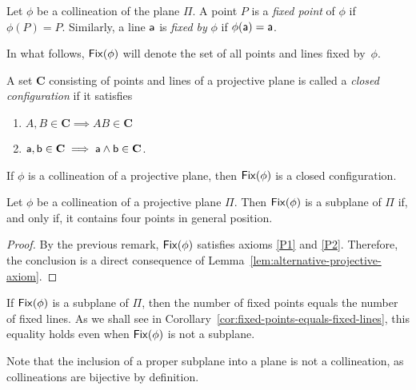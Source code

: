 \begin{defns}
    Let $\phi$ be a collineation of the plane $\Pi$. A point $P$ is a \textsl{fixed point} of $\phi$ if $\phi(P)=P$. Similarly, a line $\mathsf a$ is \textsl{fixed by} $\phi$ if $\phi(\mathsf a)=\mathsf a$.

    In what follows, $\operatorname{\mathsf{Fix}}(\phi)$ will denote the set of all points and lines fixed by~$\phi$.

    A set $\mathbf C$ consisting of points and lines of a projective plane is called a \textsl{closed configuration} if it satisfies
    \begin{enumerate}[label=c$_\arabic*.$,font=\upshape\scshape]
        \item $A,B\in\mathbf C\implies AB\in\mathbf C$
        \item $\mathsf a,\mathsf b\in\mathbf C\implies \mathsf a\wedge\mathsf b\in\mathbf C$.
    \end{enumerate}
\end{defns}

\begin{rem}
    If\/ $\phi$ is a collineation of a projective plane, then\/ $\operatorname{\mathsf{Fix}}(\phi)$ is a closed configuration.
\end{rem}

\begin{prop}\label{prop:Fix-subplane-4-points-condition}
    Let\/ $\phi$ be a collineation of a projective plane\/ $\Pi$. Then\/ $\operatorname{\mathsf{Fix}}(\phi)$ is a subplane of\/ $\Pi$ if, and only if, it contains four points in general position.
\end{prop}

\begin{proof}
    By the previous remark, $\operatorname{\mathsf{Fix}}(\phi)$ satisfies axioms \ref{P1} and \ref{P2}. Therefore, the conclusion is a direct consequence of Lemma~\ref{lem:alternative-projective-axiom}.
    
\end{proof}

\begin{rem}
    If\/ $\operatorname{\mathsf{Fix}}(\phi)$ is a subplane of\/ $\Pi$, then the number of fixed points equals the number of fixed lines. As we shall see in Corollary~\ref{cor:fixed-points-equals-fixed-lines}, this equality holds even when\/ $\operatorname{\mathsf{Fix}}(\phi)$ is not a subplane.
\end{rem}

\begin{rem}
    Note that the inclusion of a proper subplane into a plane is not a collineation, as collineations are bijective by definition.
\end{rem}

